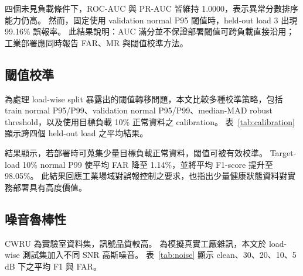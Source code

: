 \documentclass[conference,compsoc]{IEEEtran}
\begin{document}
四個未見負載條件下，ROC-AUC 與 PR-AUC 皆維持 1.0000，表示異常分數排序能力仍高。
然而，固定使用 validation normal P95 閾值時，held-out load 3 出現 99.16\% 誤報率。
此結果說明：AUC 滿分並不保證部署閾值可跨負載直接沿用；工業部署應同時報告 FAR、MR 與閾值校準方法。

\subsection{閾值校準}
為處理 load-wise split 暴露出的閾值轉移問題，本文比較多種校準策略，包括 train normal P95/P99、validation normal P95/P99、median-MAD robust threshold，以及使用目標負載 10\% 正常資料之 calibration。
表~\ref{tab:calibration} 顯示跨四個 held-out load 之平均結果。

\begin{table}[!t]
\centering
\caption{跨負載閾值校準策略之平均結果}
\label{tab:calibration}
\scriptsize
\setlength{\tabcolsep}{3pt}
\end{table}

結果顯示，若部署時可蒐集少量目標負載正常資料，閾值可被有效校準。
Target-load 10\% normal P99 使平均 FAR 降至 1.14\%，並將平均 F1-score 提升至 98.05\%。
此結果回應工業場域對誤報控制之要求，也指出少量健康狀態資料對實務部署具有高度價值。

\subsection{噪音魯棒性}
CWRU 為實驗室資料集，訊號品質較高。
為模擬真實工廠雜訊，本文於 load-wise 測試集加入不同 SNR 高斯噪音。
表~\ref{tab:noise} 顯示 clean、30、20、10、5 dB 下之平均 F1 與 FAR。

\begin{table}[!t]
\centering
\caption{噪音魯棒性分析}
\label{tab:noise}
\scriptsize
\setlength{\tabcolsep}{4pt}
\end{table}
\end{document}
